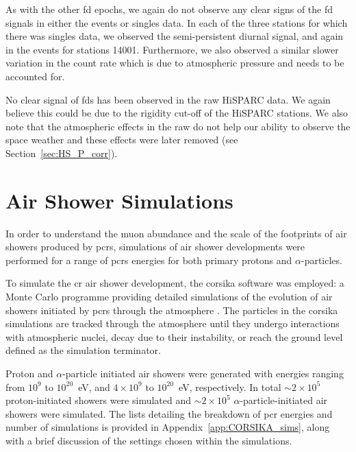 As with the other \gls{fd} epochs, we again do not observe any clear signs of the \gls{fd} signals in either the events or singles data. In each of the three stations for which there was singles data, we observed the semi-persistent diurnal signal, and again in the events for stations 14001. Furthermore, we also observed a similar slower variation in the count rate which is due to atmospheric pressure and needs to be accounted for.

No clear signal of \glspl{fd} has been observed in the raw HiSPARC data. We again believe this could be due to the rigidity cut-off of the HiSPARC stations. We also note that the atmospheric effects in the raw do not help our ability to observe the space weather and these effects were later removed (see Section~\ref{sec:HS_P_corr}). 



\section{Air Shower Simulations}\label{sec:CORSIKA}

In order to understand the muon abundance and the scale of the footprints of air showers produced by \glspl{pcr}, simulations of air shower developments were performed for a range of \glspl{pcr} energies for both primary protons and $\alpha$-particles.

To simulate the \gls{cr} air shower development, the \gls{corsika} software was employed: a Monte Carlo programme providing detailed simulations of the evolution of air showers initiated by \glspl{pcr} through the atmosphere \citep{heck_extensive_2017}. The particles in the \gls{corsika} simulations are tracked through the atmosphere until they undergo interactions with atmospheric nuclei, decay due to their instability, or reach the ground level defined as the simulation terminator.

Proton and $\alpha$-particle initiated air showers were generated with energies ranging from $10^{9}$ to $10^{20}$~eV, and $4\times10^{9}$ to $10^{20}$~eV, respectively. In total $\sim 2\times10^5$ proton-initiated showers were simulated and $\sim 2\times10^5$ $\alpha$-particle-initiated air showers were simulated. The lists detailing the breakdown of \gls{pcr} energies and number of simulations is provided in Appendix~\ref{app:CORSIKA_sims}, along with a brief discussion of the settings chosen within the simulations.


